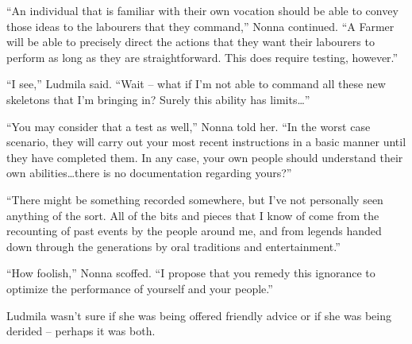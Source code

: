  

“An individual that is familiar with their own vocation should be able to convey those ideas to the labourers that they command,” Nonna continued. “A Farmer will be able to precisely direct the actions that they want their labourers to perform as long as they are straightforward. This does require testing, however.”

 

“I see,” Ludmila said. “Wait – what if I’m not able to command all these new skeletons that I’m bringing in? Surely this ability has limits…”

 

“You may consider that a test as well,” Nonna told her. “In the worst case scenario, they will carry out your most recent instructions in a basic manner until they have completed them. In any case, your own people should understand their own abilities…there is no documentation regarding yours?”

 

“There might be something recorded somewhere, but I’ve not personally seen anything of the sort. All of the bits and pieces that I know of come from the recounting of past events by the people around me, and from legends handed down through the generations by oral traditions and entertainment.”

 

“How foolish,” Nonna scoffed. “I propose that you remedy this ignorance to optimize the performance of yourself and your people.”

 

Ludmila wasn’t sure if she was being offered friendly advice or if she was being derided – perhaps it was both. 